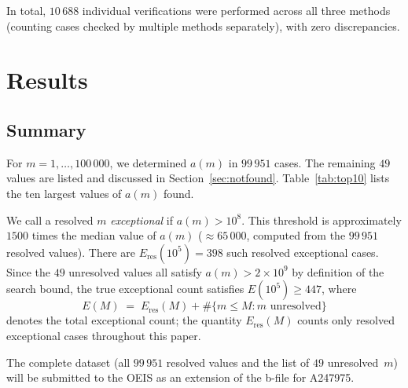 \documentclass[12pt]{article}
\begin{document}
	In total, $10\,688$ individual verifications were performed across all
	three methods (counting cases checked by multiple methods separately),
	with zero discrepancies.
	
	\section{Results}
	
	\subsection{Summary}
	
	For $m = 1, \ldots, 100\,000$, we determined $a(m)$ in $99\,951$ cases.
	The remaining $49$ values are listed and discussed in
	Section~\ref{sec:notfound}.
	Table~\ref{tab:top10} lists the ten largest values of $a(m)$ found.
	
	We call a resolved $m$ \emph{exceptional} if $a(m) > 10^8$.
	This threshold is approximately $1500$ times the median value of $a(m)$
	($\approx 65\,000$, computed from the $99\,951$ resolved values).
	There are $E_{\mathrm{res}}(10^5) = 398$ such resolved exceptional
	cases.
	Since the $49$ unresolved values all satisfy $a(m) > 2 \times 10^9$
	by definition of the search bound, the true exceptional count
	satisfies $E(10^5) \geq 447$, where
	\[
	E(M) \;=\; E_{\mathrm{res}}(M)
	+ \#\bigl\{m \leq M : m \text{ unresolved}\bigr\}
	\]
	denotes the total exceptional count; the quantity $E_{\mathrm{res}}(M)$
	counts only resolved exceptional cases throughout this paper.
	
	The complete dataset (all $99\,951$ resolved values and the list of
	$49$ unresolved~$m$) will be submitted to the OEIS as an extension of
	the b-file for A247975.
	
\end{document}
